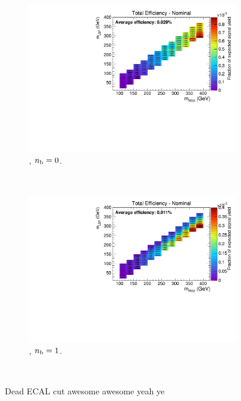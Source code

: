 \begin{figure}[h!]
\begin{subfigure}[b]{0.4\textwidth}
    \includegraphics[width=\textwidth, page=3]{Figs/sms/t2degen/v5/DeadECAL_T2_4body_v5_eq0b_ge4j_incl.pdf}
    \caption{\njhigh, $n_{\text{b}} = 0$.}
  \end{subfigure}\\
  \begin{subfigure}[b]{0.4\textwidth}
    \includegraphics[width=\textwidth, page=3]{Figs/sms/t2degen/v5/DeadECAL_T2_4body_v5_eq1b_ge4j_incl.pdf}
    \caption{\njhigh, $n_{\text{b}} = 1$.}
  \end{subfigure}\\
  \caption{Dead ECAL cut awesome awesome yeah ye}
  \label{fig:sms-deadecal-t2degen}
\end{figure}
